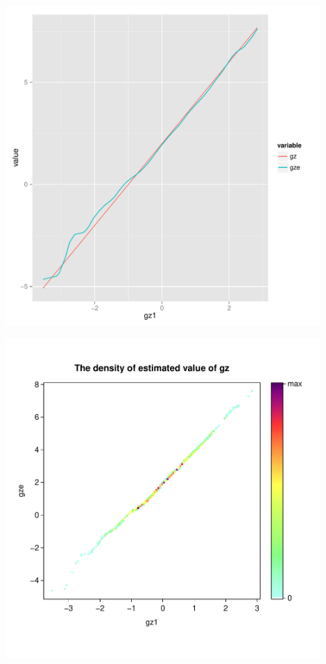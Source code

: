 \documentclass{article}
\begin{document}
\begin{minipage}[b]{0.5\textwidth}
\centering
\includegraphics[width=0.9\textwidth]{gzeplot2.pdf}
\label{fig:gzplot2.pdf}
\end{minipage}
\begin{minipage}[b]{0.5\textwidth}
\centering
\includegraphics[width=0.9\textwidth]{density2.pdf}
\label{fig:density2.pdf}
\end{minipage}
\end{document}
